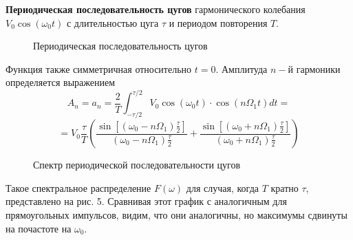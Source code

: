 \documentclass[14pt]{article}
\begin{document}
\vspace{1cm}
\textbf{Периодическая последовательность цугов} гармонического колебания $V_0\cos(\omega_0t)$ с длительностью цуга $\tau$ и периодом повторения $T$. 

\begin{figure}[h!]
	\caption{Периодическая последовательность цугов}
	\label{fig:image}
\end{figure}

Функция также симметричная относительно $t = 0$. Амплитуда $n-$й гармоники определяется выражением
$$
	A_n = a_n = \frac{2}{T}\int_{-\tau/2}^{\tau/2}V_0\cos(\omega_0t)\cdot\cos(n\Omega_1t)dt = 
$$
$$
	= V_0\frac{\tau}{T}\left(\frac{\sin[(\omega_0 - n\Omega_1)\frac{\tau}{2}]}{(\omega_0 - n\Omega_1)\frac{\tau}{2}} + 
	                         \frac{\sin[(\omega_0 + n\Omega_1)\frac{\tau}{2}]}{(\omega_0 + n\Omega_1)\frac{\tau}{2}}
	                   \right)
$$

\begin{figure}[h!]
	\caption{Спектр периодической последовательности цугов}
	\label{fig:image}
\end{figure}

Такое спектральное распределение $F(\omega)$ для случая, когда $T$ кратно $\tau$, представлено на рис. 5. Сравнивая этот график с аналогичным для прямоугольных импульсов, видим, что они аналогичны, но максимумы сдвинуты на почастоте на $\omega_0$. 
\end{document}
